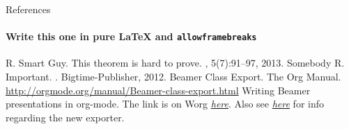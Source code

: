 \documentclass[presentation]{beamer}
\begin{document}
\begin{frame}[allowframebreaks,label=sec-1-5]{References}
\framesubtitle{Write this one in pure LaTeX and \texttt{allowframebreaks}}

\begin{thebibliography}{10}    
\beamertemplatearticlebibitems
{}
  R. Smart Guy.
  \newblock This theorem is hard to prove.
  , 5(7):91--97, 2013.
\beamertemplatebookbibitems
{}
  Somebody R. Important.
  .
  \newblock Bigtime-Publisher, 2012.
\beamertemplatearrowbibitems
{}
  Beamer Class Export.
  \newblock The Org Manual.
  \newblock \url{http://orgmode.org/manual/Beamer-class-export.html}
  Writing Beamer presentations in org-mode.
  \newblock The link is on Worg \href{http://orgmode.org/worg/exporters/beamer/tutorial.html}{\emph{here}}. Also see \href{http://orgmode.org/worg/exporters/beamer/ox-beamer.html}{\emph{here}} for info regarding the new exporter.
\end{thebibliography}
\end{frame}
\end{document}
